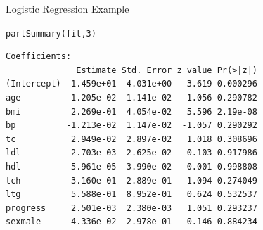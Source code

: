 \documentclass{beamer}\usepackage[]{graphicx}\usepackage[]{color}
\makeatletter
\newcommand{\hlnum}[1]{\textcolor[rgb]{0.69,0.494,0}{#1}}%
\newcommand{\hlstr}[1]{\textcolor[rgb]{0.749,0.012,0.012}{#1}}%
\newcommand{\hlcom}[1]{\textcolor[rgb]{0.514,0.506,0.514}{\textit{#1}}}%
\newcommand{\hlopt}[1]{\textcolor[rgb]{0,0,0}{#1}}%
\newcommand{\hlstd}[1]{\textcolor[rgb]{0,0,0}{#1}}%
\newcommand{\hlkwb}[1]{\textcolor[rgb]{0,0.341,0.682}{#1}}%
\newcommand{\hlkwc}[1]{\textcolor[rgb]{0,0,0}{\textbf{#1}}}%
\newcommand{\hlkwd}[1]{\textcolor[rgb]{0.004,0.004,0.506}{#1}}%
\newenvironment{kframe}{%
 \def\at@end@of@kframe{}%
 \ifinner\ifhmode%
  \def\at@end@of@kframe{\end{minipage}}%
  \begin{minipage}{\columnwidth}%
 \fi\fi%
 \def\FrameCommand##1{\hskip\@totalleftmargin \hskip-\fboxsep
 \colorbox{shadecolor}{##1}\hskip-\fboxsep
     \hskip-\linewidth \hskip-\@totalleftmargin \hskip\columnwidth}%
 \MakeFramed {\advance\hsize-\width
   \@totalleftmargin\z@ \linewidth\hsize
   \@setminipage}}%
 {\par\unskip\endMakeFramed%
 \at@end@of@kframe}
\newenvironment{knitrout}{}{} %
\makeatother
\begin{document}


\begin{frame}[fragile]{Logistic Regression Example}
  
\begin{knitrout}\footnotesize
{}\color{fgcolor}\begin{kframe}
\begin{alltt}
\hlkwd{partSummary}\hlstd{(fit,} \hlnum{3}\hlstd{)}
\end{alltt}
\begin{verbatim}
Coefficients:
              Estimate Std. Error z value Pr(>|z|)
(Intercept) -1.459e+01  4.031e+00  -3.619 0.000296
age          1.205e-02  1.141e-02   1.056 0.290782
bmi          2.269e-01  4.054e-02   5.596 2.19e-08
bp          -1.213e-02  1.147e-02  -1.057 0.290292
tc           2.949e-02  2.897e-02   1.018 0.308696
ldl          2.703e-03  2.625e-02   0.103 0.917986
hdl         -5.961e-05  3.990e-02  -0.001 0.998808
tch         -3.160e-01  2.889e-01  -1.094 0.274049
ltg          5.588e-01  8.952e-01   0.624 0.532537
progress     2.501e-03  2.380e-03   1.051 0.293237
sexmale      4.336e-02  2.978e-01   0.146 0.884234
\end{verbatim}
\end{kframe}
\end{knitrout}
  
\end{frame}
\end{document}
